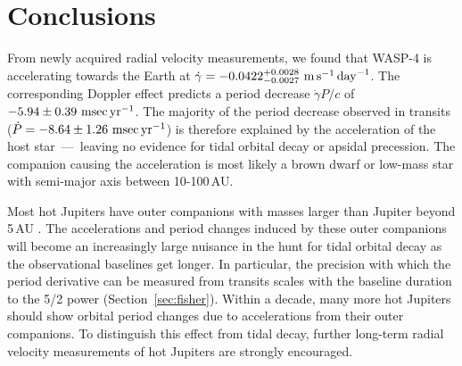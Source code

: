 \documentclass[12pt,twocolumn,tighten]{aastex62}
\begin{document}
\section{Conclusions}
\label{sec:conclusions}

From newly acquired radial velocity measurements, we found that WASP-4
is accelerating towards the Earth at $\dot{\gamma} =
-0.0422^{+0.0028}_{-0.0027}\ {\rm m}\,{\rm s}^{-1}\,{\rm day}^{-1}$.
The corresponding Doppler effect predicts a period decrease
$\dot{\gamma} P/c$ of $-5.94 \pm 0.39~{\rm msec}\,{\rm yr}^{-1}$.  The
majority of the period decrease observed in transits ($\dot{P}= - 8.64
\pm 1.26~{\rm msec}\,{\rm yr}^{-1}$) is therefore explained by the
acceleration of the host star~---~leaving no evidence
for tidal orbital decay or apsidal
precession.  The companion causing the acceleration is most likely a
brown dwarf or low-mass star with semi-major axis between
10-100$\,$AU.

Most hot Jupiters have outer companions with masses larger than
Jupiter beyond 5$\,$AU
\citep{knutson_friends_2014,bryan_statistics_2016}. The accelerations
and period changes induced by these outer companions will become an
increasingly large nuisance in the hunt for tidal orbital decay as the
observational baselines get longer.  In particular, the precision with
which the period derivative can be measured from transits scales with
the baseline duration to the 5/2 power (Section~\ref{sec:fisher}).
Within a decade, many more hot Jupiters should show orbital period
changes due to accelerations from their outer companions.  
To distinguish this effect from tidal decay, further long-term radial
velocity measurements of hot Jupiters are strongly encouraged.

\end{document}
